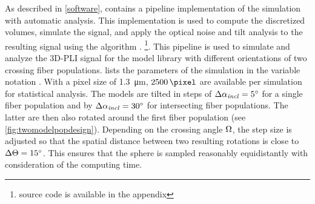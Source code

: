 % 
% 
%
As described in \cref{software}, \fastpli{} contains a pipeline implementation of the simulation with automatic analysis.
This implementation is used to compute the discretized volumes, simulate the signal, and apply the optical noise and tilt analysis to the resulting signal using the algorithm \rofl{}. \footnote{source code is available in the appendix \dummy{}}.
This pipeline is used to simulate and analyze the \ac{3D-PLI} signal for the model library with different orientations of two crossing fiber populations.
 lists the parameters of the simulation in the variable notation \fastpli{}.
With a pixel size of \SI{1.3}{\micro\meter}, $\SI{2500}{\pixel}$ are available per simulation for statistical analysis.
The models are tilted in steps of $\Delta \textnormal{$\alpha_{\mathit{incl}}$} = \SI{5}{\degree}$ for a single fiber population and by $\Delta \textnormal{$\alpha_{\mathit{incl}}$} = \SI{30}{\degree}$ for intersecting fiber populations. The latter are then also rotated around the first fiber population (see \cref{fig:twomodelpopdesign}).
Depending on the crossing angle $\textnormal{$\Omega$}$, the step size is adjusted so that the spatial distance between two resulting rotations is close to $\Delta \textnormal{$\Theta$} = \SI{15}{\degree}$.
This ensures that the sphere is sampled reasonably equidistantly with consideration of the computing time.
% 
% 
% 
